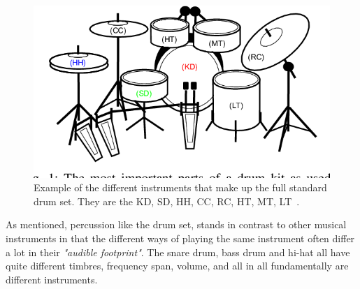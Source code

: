 \begin{figure}[H]
    \centering
    \includegraphics[scale=0.7, trim={0 1cm 0 0},clip]{figures/drumset}
    \caption{Example of the different instruments that make up the full standard drum set. They are the \acrfull{KD}, \acrfull{SD}, \acrfull{HH}, \acrfull{CC}, \acrfull{RC}, \acrfull{HT}, \acrfull{MT}, \acrfull{LT}~\cite{8350302}.}
    \label{DrumsetFigure}
\end{figure}

As mentioned, percussion like the drum set, stands in contrast to other musical instruments in that the different ways of playing the same instrument often differ a lot in their \textit{"audible footprint"}. The snare drum, bass drum and hi-hat all have quite different timbres, frequency span, volume, and all in all fundamentally are different instruments.

